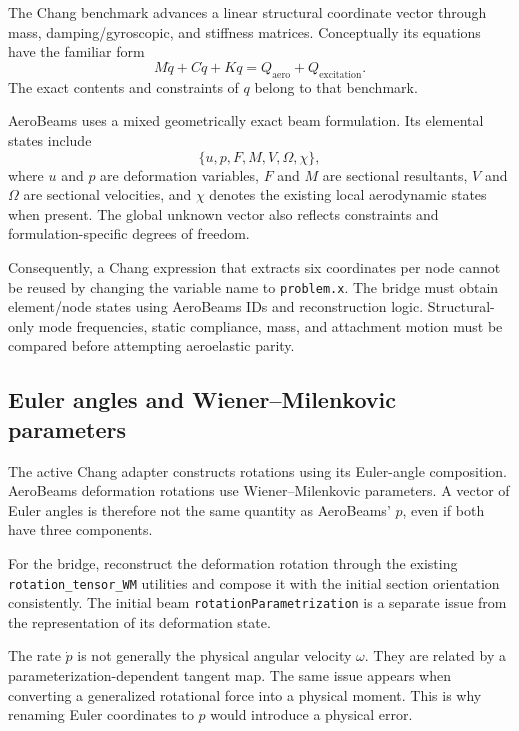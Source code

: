 \documentclass[11pt,a4paper]{article}
\newcommand{\code}{\nolinkurl}
\begin{document}
The Chang benchmark advances a linear structural coordinate vector through
mass, damping/gyroscopic, and stiffness matrices. Conceptually its equations
have the familiar form
\begin{equation}
 M\ddot q+C\dot q+Kq=Q_{\mathrm{aero}}+Q_{\mathrm{excitation}}.
\end{equation}
The exact contents and constraints of $q$ belong to that benchmark.

AeroBeams uses a mixed geometrically exact beam formulation. Its elemental
states include
\begin{equation}
 \{u,p,F,M,V,\Omega,\chi\},
\end{equation}
where $u$ and $p$ are deformation variables, $F$ and $M$ are sectional
resultants, $V$ and $\Omega$ are sectional velocities, and $\chi$ denotes
the existing local aerodynamic states when present. The global unknown
vector also reflects constraints and formulation-specific degrees of freedom.

Consequently, a Chang expression that extracts six coordinates per node
cannot be reused by changing the variable name to \code{problem.x}. The bridge
must obtain element/node states using AeroBeams IDs and reconstruction logic.
Structural-only mode frequencies, static compliance, mass, and attachment
motion must be compared before attempting aeroelastic parity.

\subsection{Euler angles and Wiener--Milenkovic parameters}

The active Chang adapter constructs rotations using its Euler-angle
composition. AeroBeams deformation rotations use Wiener--Milenkovic
parameters. A vector of Euler angles is therefore not the same quantity as
AeroBeams' $p$, even if both have three components.

For the bridge, reconstruct the deformation rotation through the existing
\code{rotation_tensor_WM} utilities and compose it with the initial section
orientation consistently. The initial beam \code{rotationParametrization}
is a separate issue from the representation of its deformation state.

The rate $\dot p$ is not generally the physical angular velocity $\omega$.
They are related by a parameterization-dependent tangent map. The same issue
appears when converting a generalized rotational force into a physical moment.
This is why renaming Euler coordinates to $p$ would introduce a physical error.
\end{document}
